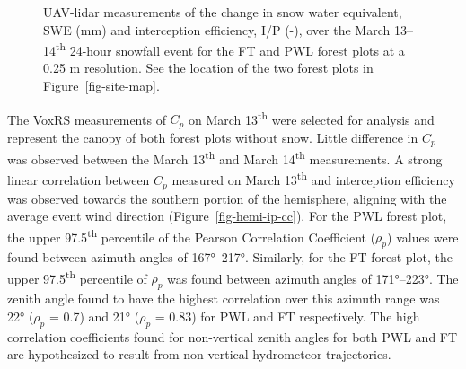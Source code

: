 \documentclass[
  letterpaper,
  DIV=11,
  numbers=noendperiod]{scrartcl}
\begin{document}
\begin{figure}[H]


\caption{\label{fig-lidar-tf-ip}UAV-lidar measurements of the change in
snow water equivalent, SWE (mm) and interception efficiency, I/P (-),
over the March 13--14\textsuperscript{th} 24-hour snowfall event for the
FT and PWL forest plots at a 0.25 m resolution. See the location of the
two forest plots in Figure~\ref{fig-site-map}.}

\end{figure}%

The VoxRS measurements of \(C_p\) on March 13\textsuperscript{th} were
selected for analysis and represent the canopy of both forest plots
without snow. Little difference in \(C_p\) was observed between the
March 13\textsuperscript{th} and March 14\textsuperscript{th}
measurements. A strong linear correlation between \(C_p\) measured on
March 13\textsuperscript{th} and interception efficiency was observed
towards the southern portion of the hemisphere, aligning with the
average event wind direction (Figure~\ref{fig-hemi-ip-cc}). For the PWL
forest plot, the upper 97.5\textsuperscript{th} percentile of the
Pearson Correlation Coefficient (\(\rho_p\)) values were found between
azimuth angles of 167°--217°. Similarly, for the FT forest plot, the
upper 97.5\textsuperscript{th} percentile of \(\rho_p\) was found
between azimuth angles of 171°--223°. The zenith angle found to have the
highest correlation over this azimuth range was 22° (\(\rho_p\) = 0.7)
and 21° (\(\rho_p\) = 0.83) for PWL and FT respectively. The high
correlation coefficients found for non-vertical zenith angles for both
PWL and FT are hypothesized to result from non-vertical hydrometeor
trajectories.
\end{document}
